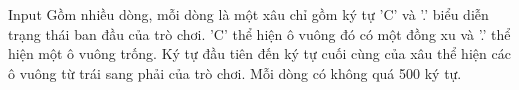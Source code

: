 Input
Gồm nhiều dòng, mỗi dòng là một xâu chỉ gồm ký tự 'C' và '.' biểu diễn trạng thái ban đầu của trò chơi. 'C' thể hiện ô vuông đó có một đồng xu và '.' thể hiện một ô vuông trống. Ký tự đầu tiên đến ký tự cuối cùng của xâu thể hiện các ô vuông từ trái sang phải của trò chơi. Mỗi dòng có không quá 500 ký tự.